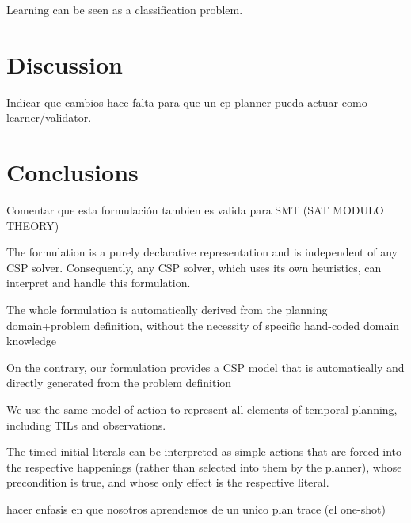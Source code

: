 \documentclass[runningheads]{llncs}
\begin{document}
Learning can be seen as a classification problem.


\section{Discussion}
\label{sec:discussion}

Indicar que cambios hace falta para que un cp-planner pueda actuar como learner/validator.


\section{Conclusions}
\label{sec:conclusions}

Comentar que esta formulación tambien es valida para SMT (SAT MODULO THEORY)


The formulation is a purely declarative representation and is independent of
any CSP solver. Consequently, any CSP solver, which uses its own heuristics, can interpret and handle this
formulation.


The whole formulation is automatically derived from the planning
domain+problem definition, without the necessity of specific
hand-coded domain knowledge


On the contrary, our formulation provides a CSP
model that is automatically and directly generated from the problem
definition



We use the same model of action to represent all elements of temporal planning, including TILs and observations.

The timed initial literals can be interpreted as simple actions that are forced into the respective happenings (rather than selected into them by the planner), whose precondition is true, and whose only effect is the respective literal.

hacer enfasis en que nosotros aprendemos de un unico plan trace (el one-shot)

%
%
%


%
\end{document}
